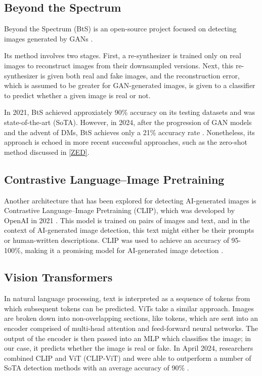 \documentclass{article} %
\begin{document}
\subsection{Beyond the Spectrum}

Beyond the Spectrum (BtS) is an open-source project focused on detecting images generated by GANs \citep{he2021spectrumdetectingdeepfakesresynthesis}.

Its method involves two stages. First, a re-synthesizer is trained only on real images to reconstruct images from their downsampled versions. Next, this re-synthesizer is given both real and fake images, and the reconstruction error, which is assumed to be greater for GAN-generated images, is given to a classifier to predict whether a given image is real or not.

In 2021, BtS achieved approxiately 90\% accuracy on its testing datasets and was state-of-the-art (SoTA). However, in 2024, after the progression of GAN models and the advent of DMs, BtS achieves only a 21\% accuracy rate \citep{li2024adversarialaiartunderstandinggeneration}. Nonetheless, its approach is echoed in more recent successful approaches, such as the zero-shot method discussed in \ref{ZED}.

\subsection{Contrastive Language–Image Pretraining}

Another architecture that has been explored for detecting AI-generated images is Contrastive Language–Image Pretraining (CLIP), which was developed by OpenAI in 2021 \citep{radford2021learningtransferablevisualmodels}. This model is trained on pairs of images and text, and in the context of AI-generated image detection, this text might either be their prompts or human-written descriptions. CLIP was used to achieve an accuracy of 95-100\%, making it a promising model for AI-generated image detection \citep{moskowitz2024detectingaigeneratedimagesclip}.

\subsection{Vision Transformers}

In natural language processing, text is interpreted as a sequence of tokens from which subsequent tokens can be predicted. ViTs take a similar approach. Images are broken down into non-overlapping sections, like tokens, which are sent into an encoder comprised of multi-head attention and feed-forward neural networks. The output of the encoder is then passed into an MLP which classifies the image; in our case, it predicts whether the image is real or fake. In April 2024, researchers combined CLIP and ViT (CLIP-ViT) and were able to outperform a number of SoTA detection methods with an average accuracy of 90\% \citep{cozzolino2024raisingbaraigeneratedimage}.
\end{document}
